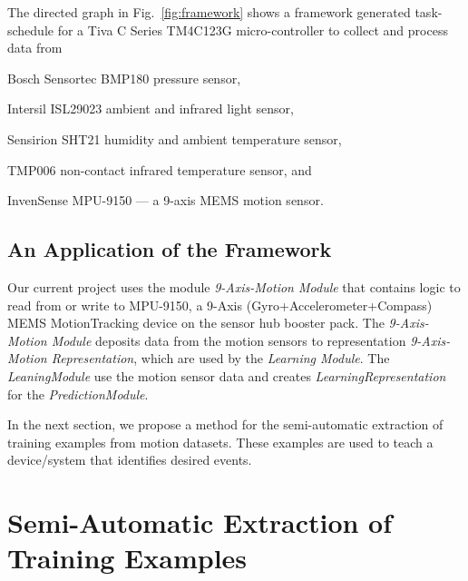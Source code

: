 \documentclass[]{IEEEtran}
\begin{document}
The directed graph in Fig.~\ref{fig:framework} shows a framework generated
task-schedule for  a Tiva C Series TM4C123G micro-controller to collect and
process data from \begin{inparaenum}[($i$)] \item Bosch Sensortec BMP180
pressure sensor, \item Intersil ISL29023 ambient and infrared light sensor,
\item Sensirion SHT21 humidity and ambient temperature sensor,  \item  TMP006
non-contact infrared temperature sensor, and \item InvenSense MPU-9150 --- a
9-axis MEMS motion sensor. \end{inparaenum}



\subsection{An Application of the Framework}

Our current project uses the module {\em 9-Axis-Motion Module} that contains
logic to read from or write to MPU-9150, a 9-Axis (Gyro+Accelerometer+Compass)
MEMS MotionTracking device on the sensor hub booster pack. The {\em
9-Axis-Motion Module} deposits data from the motion sensors to representation
{\em 9-Axis-Motion Representation}, which are used by the {\em Learning
Module}. The {\em LeaningModule} use the motion sensor data and creates {\em
LearningRepresentation} for the {\em PredictionModule}. 

\par 

In the next section, we propose a method for the semi-automatic extraction of
training examples from motion datasets. These examples are used to teach a
device/system that identifies desired events. 

\section{Semi-Automatic Extraction of  Training Examples}
\label{sec:SemiAutomaticExtractionOfTrainingVectors}
\end{document}

